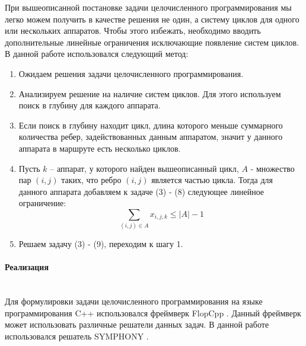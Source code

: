 \documentclass[a4paper,14pt,russian]{article}
\begin{document}
При вышеописанной постановке задачи целочисленного программирования мы легко можем получить в качестве решения не один, а систему циклов для одного или нескольких аппаратов. Чтобы этого избежать, необходимо вводить дополнительные линейные ограничения исключающие появление систем циклов. В данной работе использовался следующий метод:
\begin{enumerate}
\item  Ожидаем решения задачи целочисленного программирования.
\item Анализируем решение на наличие систем циклов. Для этого используем поиск в глубину для каждого аппарата.
\item Если поиск в глубину находит цикл, длина которого меньше суммарного количества ребер, задействованных данным аппаратом, значит у данного аппарата в маршруте есть несколько циклов.
\item Пусть $k$ -- аппарат, у которого найден вышеописанный цикл, $A$ - множество пар $(i, j)$ таких, что ребро $(i, j)$ является частью цикла. Тогда для данного аппарата добавляем к задаче (3) - (8) следующее линейное ограничение:
\begin{equation}
\displaystyle \sum_{(i,j) \in A} x_{i,j,k} \le |A| - 1
\end{equation}

\item Решаем задачу (3) - (9), переходим к шагу 1.
\end{enumerate}


\paragraph{Реализация} ~\\
Для формулировки задачи целочисленного программирования на языке программирования C++ использовался фреймверк FlopCpp \cite{hultberg2007flopc++}. Данный фреймверк может использовать различные решатели данных задач. В данной работе использовался решатель SYMPHONY \cite{ralphs2005symphony}.


\end{document}
